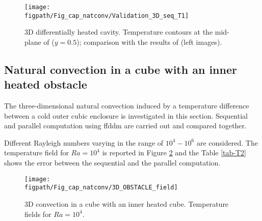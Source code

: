 \begin{figure}%
\begin{minipage}{\linewidth}
\begin{center}
 {\texttt{[image: \\figpath/Fig\_cap\_natconv/Validation\_3D\_seq\_T1]}}
\end{center}
\end{minipage}
\caption{3D differentially heated cavity. Temperature contours at the mid-plane of ($y=0.5$); comparison with the results of \cite{Wakashima-2004} (left images). }
\label{fig-3DT} 
\end{figure}



\subsection{Natural convection in a cube with an inner heated obstacle}\label{sub-OBSTACLE-3D}

The three-dimensional natural convection induced by a temperature difference between a cold outer cubic enclosure is investigated in this section.
Sequential and parallel computation using ffddm are carried out and compared together.

Different Rayleigh numbers varying in the range of $10^4 -10^6$ are considered. The temperature field for $Ra = 10^4$ is reported in Figure \ref{fig-obstacle-Ra1e4} and the Table \ref{tab-T2} shows the error between the sequential and the parallel computation.

\begin{figure}%
\begin{center}
\begin{minipage}{\linewidth}
 {\texttt{[image: \\figpath/Fig\_cap\_natconv/3D\_OBSTACLE\_field]}}
\end{minipage}
\end{center}
\caption{3D convection in a cube with an inner heated cube. Temperature fields for $Ra = 10^4$.}
\label{fig-obstacle-Ra1e4} 
\end{figure}

